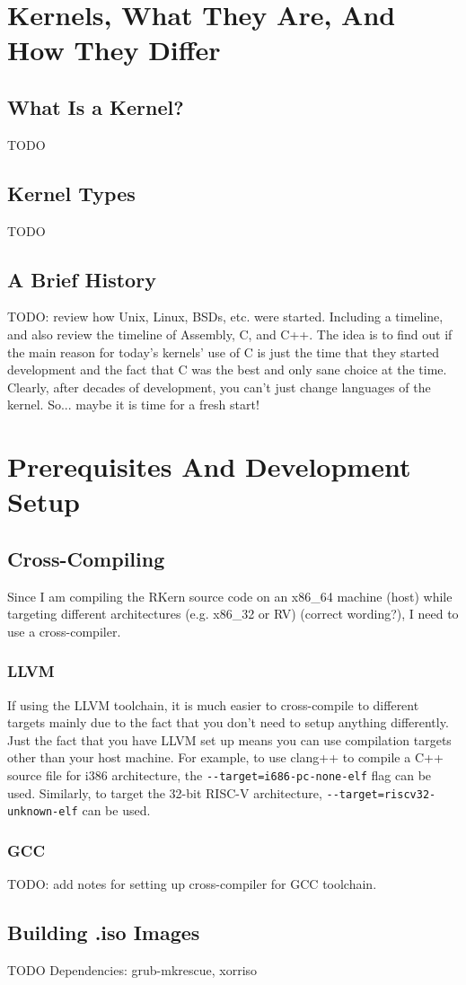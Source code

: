 \documentclass[a4paper,12pt,twoside]{report}
\begin{document}
    \chapter{Kernels, What They Are, And How They Differ}
    
	    \section{What Is a Kernel?}
	    	TODO
	    
	    \section{Kernel Types}
	    	TODO
	    
	    \section{A Brief History}
	        TODO: review how Unix, Linux, BSDs, etc. were started. Including a timeline, and also review the timeline of Assembly, C, and C++. The idea is to find out if the main reason for today's kernels' use of C is just the time that they started development and the fact that C was the best and only sane choice at the time. Clearly, after decades of development, you can't just change languages of the kernel. So... maybe it is time for a fresh start!
	
    \chapter{Prerequisites And Development Setup}
    
	    \section{Cross-Compiling}
	        Since I am compiling the RKern source code on an x86\_64 machine (host) while targeting different architectures (e.g. x86\_32 or RV) (correct wording?), I need to use a cross-compiler.
	        
	        \subsection{LLVM}
	        If using the LLVM toolchain, it is much easier to cross-compile to different targets mainly due to the fact that you don't need to setup anything differently. Just the fact that you have LLVM set up means you can use compilation targets other than your host machine.
	        For example, to use clang++ to compile a C++ source file for i386 architecture, the \verb|--target=i686-pc-none-elf| flag can be used. Similarly, to target the 32-bit RISC-V architecture, \verb|--target=riscv32-unknown-elf| can be used.
	
			\subsection{GCC}
	        TODO: add notes for setting up cross-compiler for GCC toolchain.
	    
	    \section{Building .iso Images}
	    TODO
	    Dependencies: grub-mkrescue, xorriso
    
    
    \printbibliography
\end{document}
